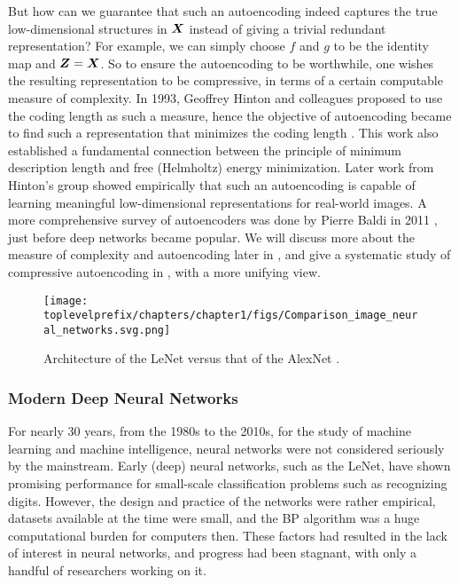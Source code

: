 \documentclass[../../book-main.tex]{subfiles}
\begin{document}
But how can we guarantee that such an autoencoding indeed captures the true low-dimensional structures in $\bm{X}$ instead of giving a trivial redundant representation? For example, we can simply choose $f$ and $g$ to be the identity map and $\bm{Z} = \bm{X}$. So to ensure the autoencoding to be worthwhile, one wishes the resulting representation to be compressive, in terms of a certain computable measure of complexity. In 1993, Geoffrey Hinton and colleagues proposed to use the coding length as such a measure, hence the objective of autoencoding became to find such a representation that minimizes the coding length \cite{Hinton-1993}. This work also established a fundamental connection between the principle of minimum description length \cite{Rissanen-1978} and free (Helmholtz) energy minimization. Later work \cite{Hinton504} from Hinton's group showed empirically that such an autoencoding is capable of learning meaningful low-dimensional representations for real-world images. A more comprehensive survey of autoencoders was done by Pierre Baldi in 2011 \cite{Baldi2011}, just before deep networks became popular. We will discuss more about the measure of complexity and autoencoding later in , and give a systematic study of compressive autoencoding in , with a more unifying view.


\begin{figure}
    \centering
    \texttt{[image: \\toplevelprefix/chapters/chapter1/figs/Comparison\_image\_neural\_networks.svg.png]}
    \caption{Architecture of the LeNet \cite{LeCun-1989} versus that of the AlexNet \cite{krizhevsky2012imagenet}.}
    \label{fig:LeNet-AlexNet}
\end{figure}


\subsubsection{Modern Deep Neural Networks}
For nearly 30 years, from the 1980s to the 2010s, for the study of machine learning and machine intelligence, neural networks were not considered seriously by the mainstream. Early (deep) neural networks, such as the LeNet, have shown promising performance for small-scale classification problems such as recognizing digits. However, the design and practice of the networks were rather empirical, datasets available at the time were small, and the BP algorithm was a huge computational burden for computers then. These factors had resulted in the lack of interest in neural networks, and progress had been stagnant, with only a handful of researchers working on it. 
\end{document}
